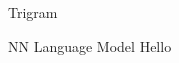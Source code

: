 \documentclass[11pt]{article}
\begin{document}
\begin{subsection}{Trigram}
%
%
%
%
%
%
%
%

\end{subsection}




\begin{subsection}{NN Language Model}
Hello


\end{subsection}
\end{document}
